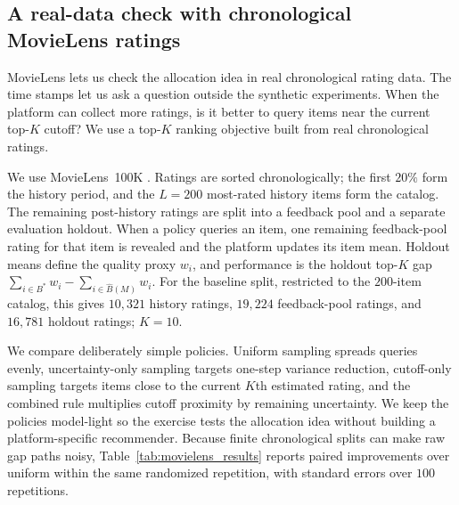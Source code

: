 \documentclass[11pt]{article}
\theoremstyle{definition}
\theoremstyle{remark}
\newcommand{\1}{\mathbf{1}}
\begin{document}
\FloatBarrier

\subsection[MovieLens check]{A real-data check with chronological MovieLens ratings}
\label{subsec:numerics_movielens}

MovieLens lets us check the allocation idea in real chronological rating
data. The time stamps let us ask a question outside the synthetic experiments.
When the platform can collect more ratings, is it better to query items
near the current top-\(K\) cutoff? We use a top-\(K\) ranking objective built from real
chronological ratings.

We use MovieLens~100K \citep{HarperKonstan2016}. Ratings are sorted
chronologically; the first \(20\%\) form the history period, and the
\(L=200\) most-rated history items form the catalog. The remaining
post-history ratings are split into a feedback pool and a separate
evaluation holdout. When a policy queries an item, one remaining
feedback-pool rating for that item is revealed and the platform updates
its item mean. Holdout means define the quality proxy \(w_i\), and
performance is the holdout top-\(K\) gap
\(\sum_{i\in B^*}w_i-\sum_{i\in \hat B(M)}w_i\). For the baseline split,
restricted to the \(200\)-item catalog, this gives \(10{,}321\)
history ratings, \(19{,}224\) feedback-pool
ratings, and \(16{,}781\) holdout ratings; \(K=10\).

We compare deliberately simple policies. Uniform sampling spreads queries
evenly, uncertainty-only sampling targets one-step variance reduction,
cutoff-only sampling targets items close to the current \(K\)th estimated
rating, and the combined rule multiplies cutoff proximity by remaining
uncertainty. We keep the policies model-light so the exercise tests the
allocation idea without building a platform-specific
recommender. Because finite
chronological splits can make raw gap paths noisy, Table~\ref{tab:movielens_results}
reports paired improvements over uniform within the same randomized
repetition, with standard errors over \(100\) repetitions.
\end{document}
